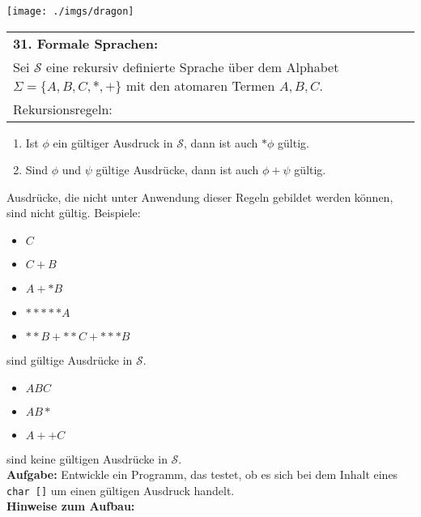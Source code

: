 \documentclass[paper=A4, pagesize, DIV=calc, smallheadings,
fontsize=11pt, expansion=false]{scrreprt}
\begin{document}
\begin{minipage}[H]{0.25\linewidth}
\texttt{[image: ./imgs/dragon]}
\end{minipage}
\begin{tabular}{m{35em}}
 \textbf{31. Formale Sprachen:}\\
  Sei $\mathcal{S}$ eine rekursiv definierte Sprache über dem Alphabet $\Sigma = \{A, B, C, *, +\}$  mit den atomaren Termen $A, B, C$.\\
  Rekursionsregeln:
\end{tabular}
  \begin{enumerate}
  \item Ist $\phi$ ein gültiger Ausdruck in $\mathcal{S}$, dann ist auch $*\phi$ gültig.
  \item Sind $\phi$ und $\psi$ gültige Ausdrücke, dann ist auch $\phi+\psi$ gültig.   
  \end{enumerate}
 Ausdrücke, die nicht unter Anwendung dieser Regeln gebildet werden können, sind nicht gültig.
  Beispiele:
  \begin{itemize}
  \item $C$ 
  \item $C+B$
  \item $A+*B$
  \item $*****A$
  \item $**B+**C+***B$ 
  \end{itemize}
  sind gültige Ausdrücke in $\mathcal{S}$.
  \begin{itemize}
  \item $ABC$ 
  \item $AB*$ 
  \item $A++C$   
  \end{itemize}
   sind keine gültigen Ausdrücke in $\mathcal{S}$.\\\textsc{
}
  \textbf{Aufgabe:} Entwickle ein Programm, das testet, 
  ob es sich bei dem Inhalt eines \texttt{char []} um einen gültigen Ausdruck handelt.\\
  \textbf{Hinweise zum Aufbau:}\\
\end{document}
